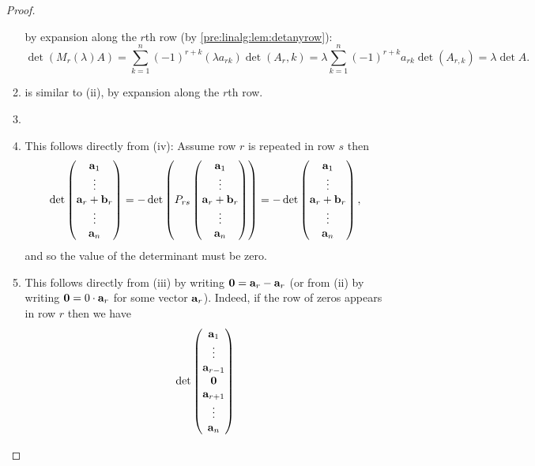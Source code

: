 \documentclass[10pt, a4paper]{article}
\begin{document}
\begin{enumerate}[label = (\roman*)]
\begin{proof}
\begin{enumerate}[label = (\roman*)]
            by expansion along the $r$th row (by \autoref{pre:linalg:lem:detanyrow}):
            \[
            \det(M_r(\lambda)A) = \sum_{k = 1}^{n}(-1) ^ {r + k}(\lambda a_{rk})\det(A_r, k) = \lambda\sum_{k = 1}^{n}(-1) ^ {r + k}a_{rk}\det(A_{r, k}) = \lambda\det A.
            \]
            \item is similar to (ii),
            by expansion along the $r$th row.
            \item \phantom{}
            \item This follows directly from (iv):
            Assume row $r$ is repeated in row $s$ then
            \[
            \det\begin{pmatrix}
                \mathbf{a}_1 \\ \vdots \\ \mathbf{a}_r + \mathbf{b}_r \\ \vdots \\ \mathbf{a}_n
            \end{pmatrix}
            =
            -\det\left(P_{rs}\begin{pmatrix}
                \mathbf{a}_1 \\ \vdots \\ \mathbf{a}_r + \mathbf{b}_r \\ \vdots \\ \mathbf{a}_n
            \end{pmatrix}\right)
            =
            -\det\begin{pmatrix}
                \mathbf{a}_1 \\ \vdots \\ \mathbf{a}_r + \mathbf{b}_r \\ \vdots \\ \mathbf{a}_n
            \end{pmatrix},
            \]
            and so the value of the determinant must be zero.
            \item This follows directly from (iii) by writing $\mathbf{0} = \mathbf{a}_r - \mathbf{a}_r$ (or from (ii) by writing $\mathbf{0} = 0 \cdot \mathbf{a}_r$ for some vector $\mathbf{a}_r$).
            Indeed,
            if the row of zeros appears in row $r$ then we have
            \[
            \det\begin{pmatrix}
                \mathbf{a}_1 \\ \vdots \\ \mathbf{a}_{r - 1} \\ \mathbf{0} \\ \mathbf{a}_{r + 1} \\ \vdots \\ \mathbf{a}_n

\end{pmatrix}\]
\end{enumerate}
\end{proof}
\end{enumerate}
\end{document}
